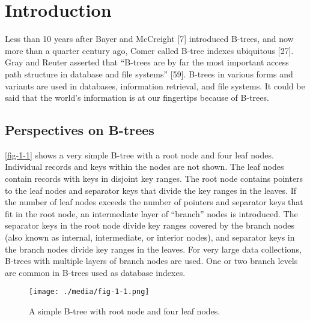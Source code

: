 \hypertarget{introduction}{%
\chapter{Introduction}\label{introduction}}

Less than 10 years after Bayer and McCreight {[}7{]} introduced B-trees,
and now more than a quarter century ago, Comer called B-tree indexes
ubiquitous {[}27{]}. Gray and Reuter asserted that ``B-trees are by far
the most important access path structure in database and file systems''
{[}59{]}. B-trees in various forms and variants are used in databases,
information retrieval, and file systems. It could be said that the
world's information is at our fingertips because of B-trees.

\hypertarget{perspectives-on-b-trees}{%
\section{Perspectives on B-trees}\label{perspectives-on-b-trees}}

\autoref{fig-1-1} shows a very simple B-tree with a root node and four leaf
nodes. Individual records and keys within the nodes are not shown. The
leaf nodes contain records with keys in disjoint key ranges. The root
node contains pointers to the leaf nodes and separator keys that divide
the key ranges in the leaves. If the number of leaf nodes exceeds the
number of pointers and separator keys that fit in the root node, an
intermediate layer of ``branch'' nodes is introduced. The separator keys
in the root node divide key ranges covered by the branch nodes (also
known as internal, intermediate, or interior nodes), and separator keys
in the branch nodes divide key ranges in the leaves. For very large data
collections, B-trees with multiple layers of branch nodes are used. One
or two branch levels are common in B-trees used as database indexes.

\begin{figure}
  \centering
  \texttt{[image: ./media/fig-1-1.png]}

  \caption{A simple B-tree with root node and four leaf nodes.\label{fig-1-1}}
\end{figure}


